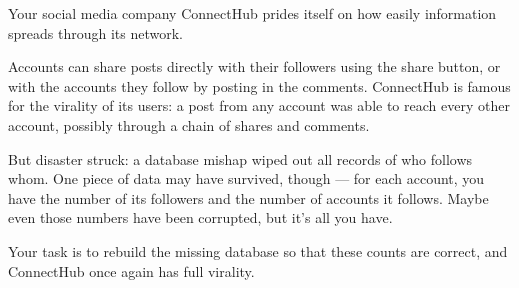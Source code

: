 
Your social media company ConnectHub prides itself on how easily 
information spreads through its network.

Accounts can share posts directly with their followers using the 
share button, or with the accounts they follow by posting in the comments. 
ConnectHub is famous for the virality of its users: a post from any account 
was able to reach every other account, possibly through a chain of shares and comments.

But disaster struck: a database mishap wiped out all records of who follows whom. 
One piece of data may have survived, though — for each account, you have the number 
of its followers and the number of accounts it follows.
Maybe even those numbers have been corrupted, but it's all you have.

Your task is to rebuild the missing database so that these counts are correct, 
and ConnectHub once again has full virality.

